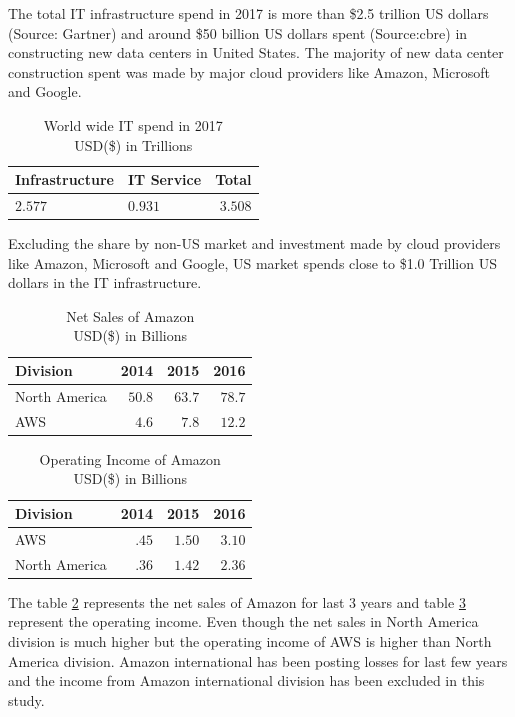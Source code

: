 \documentclass[fleqn,10pt]{SelfArx} %
\begin{document}
The total IT infrastructure spend in 2017 is more than \$2.5 trillion US dollars (Source: Gartner) and around \$50 billion US dollars spent (Source:cbre)  in constructing new data centers in United States. The majority of new data center construction spent was made by major cloud providers like Amazon, Microsoft and Google. 

\begin{table}[hbt]
\caption{World wide IT spend in 2017\\ USD(\$) in Trillions}
\centering
\begin{tabular}{llr}
\toprule
 Infrastructure & IT Service & Total \\
\midrule
$2.577$ & $0.931$ & $3.508$ \\
\bottomrule
\end{tabular}
\label{tab:label}
\end{table}

Excluding the share by non-US market and investment made by cloud providers like Amazon, Microsoft and Google, US market spends close to \$1.0 Trillion US dollars in the IT infrastructure. 


\begin{table}[hbt]
\caption{Net Sales of Amazon\\ USD(\$) in Billions}
\centering
\begin{tabular}{lrrr}
\toprule
Division & 2014 & 2015 & 2016 \\
\midrule
North America & $50.8$ & $63.7$ & $78.7$ \\
AWS & $4.6$ & $7.8$ & $12.2$ \\
\bottomrule
\end{tabular}
\label{table:sales}
\end{table}


\begin{table}[hbt]
\caption{Operating Income of Amazon\\ USD(\$) in Billions}
\centering
\begin{tabular}{lrrr}
\toprule
Division & 2014 & 2015 & 2016 \\
\midrule
AWS & $.45$ & $1.50$ & $3.10$ \\
North America & $.36$ & $1.42$ & $2.36$ \\
\bottomrule
\end{tabular}
\label{table:income}
\end{table}

The table \ref{table:sales} represents the net sales of Amazon for last 3 years and table \ref{table:income} represent the operating income. Even though the net sales in North America division is much higher but the operating income of AWS is higher than North America division. Amazon international has been posting losses for last few years and the income from Amazon international division has been excluded in this study. 
\end{document}
